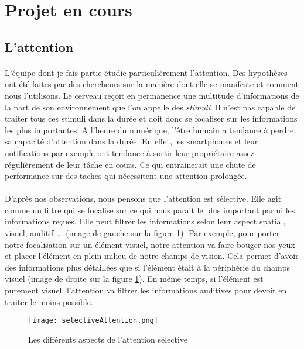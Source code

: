 \section{Projet en cours}

\subsection{L'attention}

\paragraph{}L'équipe dont je fais partie étudie particulièrement l'attention. Des hypothèses ont été faites par des chercheurs sur la manière dont elle se manifeste et comment nous
l'utilisons. Le cerveau reçoit en permanence une multitude d'informations de la part de son environnement que l'on appelle des \emph{stimuli}. Il n'est pas capable de traiter tous ces
stimuli dans la durée et doit donc se focaliser sur les informations les plus importantes. A l'heure du numérique, l'être humain a tendance à perdre sa capacité d'attention dans la
durée. En effet, les smartphones et leur notifications par exemple ont tendance à sortir leur propriétaire assez régulièrement de leur tâche en cours. Ce qui entrainerait une chute de
performance sur des taches qui nécessitent une attention prolongée.

\paragraph{}D'après nos observations, nous pensons que l'attention est sélective. Elle agit comme un filtre qui se focalise sur ce qui nous parait le plus important parmi les
informations reçues. Elle peut filtrer les informations selon leur aspect spatial, visuel, auditif ... (image de gauche sur la figure \ref{AspectSelectiveAttention}). Par exemple, pour
porter notre focalisation sur un élément visuel, notre attention va faire bouger nos yeux et placer l'élément en plein milieu de notre champs de vision. Cela permet d'avoir des
informations plus détaillées que si l'élément était à la périphérie du champs visuel (image de droite sur la figure \ref{AspectSelectiveAttention}). En même temps, si l'élément est
purement visuel, l'attention va filtrer les informations auditives pour devoir en traiter le moins possible.

\begin{figure}[h]
    \begin{center}
    \texttt{[image: selectiveAttention.png]}
    \end{center}
    \caption{Les différents aspects de l'attention sélective}
\label{AspectSelectiveAttention}
\end{figure}

